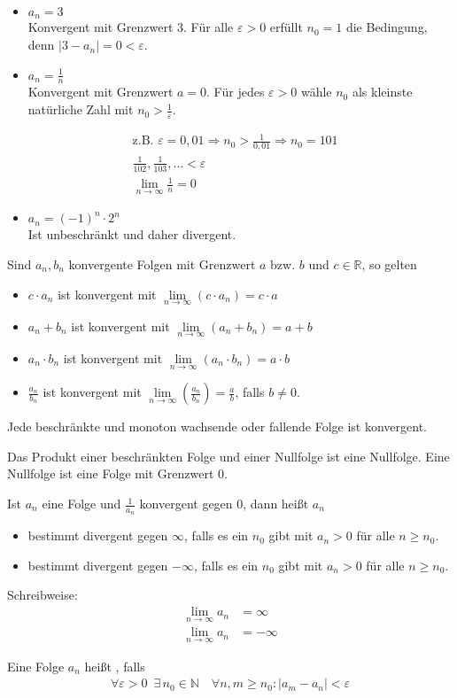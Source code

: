 \begin{itemize}
	\item{$a_n = 3$\\Konvergent mit Grenzwert 3. Für alle $\varepsilon > 0$ erfüllt $n_0 = 1$ die Bedingung, denn $|3 - a_n| = 0 < \varepsilon$.}
	\item{$a_n = \frac{1}{n}$\\Konvergent mit Grenzwert $a = 0$. Für jedes $\varepsilon > 0$ wähle $n_0$ als kleinste natürliche Zahl mit $n_0 > \frac{1}{\varepsilon}$.}
\end{itemize}
\begin{align*}
	&\text{z.B. }\varepsilon = 0,01 \Rightarrow  n_0 > \frac{1}{0,01} \Rightarrow n_0 = 101 \\
	&\frac{1}{102}, \frac{1}{103}, \dots < \varepsilon \\[2mm]
	&\lim\limits_{n \to \infty}\frac{1}{n} = 0
\end{align*}
\begin{itemize}
	\item{$a_n = (-1)^n \cdot 2^n$\\Ist unbeschränkt und daher divergent.}
\end{itemize}

Sind $a_n, b_n$ konvergente Folgen mit Grenzwert $a$ bzw. $b$ und $c \in \mathbb{R}$, so gelten
\begin{itemize}
	\item{$c \cdot a_n$ ist konvergent mit $\lim\limits_{n \to \infty}(c \cdot a_n) = c \cdot a$}
	\item{$a_n + b_n$ ist konvergent mit $\lim\limits_{n \to \infty}(a_n + b_n) = a + b$}
	\item{$a_n \cdot b_n$ ist konvergent mit $\lim\limits_{n \to \infty}(a_n \cdot b_n) = a \cdot b$}
	\item{$\frac{a_n}{b_n}$ ist konvergent mit $\lim\limits_{n \to \infty}\left(\frac{a_n}{b_n}\right) = \frac{a}{b}$, falls $b \neq 0$.}
\end{itemize}

Jede beschränkte und monoton wachsende oder fallende Folge ist konvergent.

Das Produkt einer beschränkten Folge und einer Nullfolge ist eine Nullfolge. Eine Nullfolge ist eine Folge mit Grenzwert $0$.

Ist $a_n$ eine Folge und $\frac{1}{a_n}$ konvergent gegen $0$, dann heißt $a_n$
\begin{itemize}
	\item{bestimmt divergent gegen $\infty$, falls es ein $n_0$ gibt mit $a_n > 0$ für alle $n \geq n_0$.}
	\item{bestimmt divergent gegen $-\infty$, falls es ein $n_0$ gibt mit $a_n >0$ für alle $n \geq n_0$.}
\end{itemize}
Schreibweise:
\begin{align*}
	\lim\limits_{n \to \infty}a_n &= \infty \\[2mm]
	\lim\limits_{n \to \infty}a_n &= -\infty
\end{align*}

Eine Folge $a_n$ heißt , falls
\begin{align*}
	\forall\varepsilon > 0\enspace\exists\,n_0 \in \mathbb{N}\quad\forall n, m \geq n_0 : |a_m - a_n| < \varepsilon
\end{align*}
